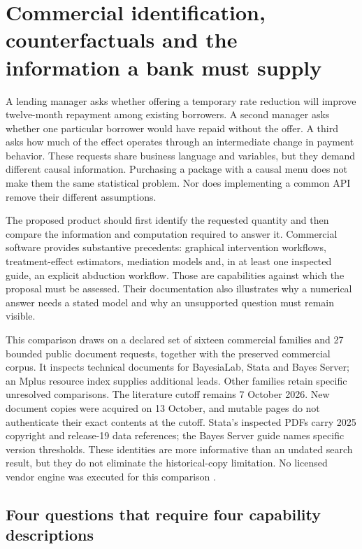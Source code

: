 \chapter{Commercial identification, counterfactuals and the information a bank must supply}
\label{exec13:commercial-identification}

A lending manager asks whether offering a temporary rate reduction will improve
twelve-month repayment among existing borrowers. A second manager asks whether
one particular borrower would have repaid without the offer. A third asks how
much of the effect operates through an intermediate change in payment behavior.
These requests share business language and variables, but they demand different
causal information. Purchasing a package with a causal menu does not make them
the same statistical problem. Nor does implementing a common API remove their
different assumptions.

The proposed product should first identify the requested quantity and then
compare the information and computation required to answer it. Commercial
software provides substantive precedents: graphical intervention workflows,
treatment-effect estimators, mediation models and, in at least one inspected
guide, an explicit abduction workflow. Those are capabilities against which the
proposal must be assessed. Their documentation also illustrates why a numerical
answer needs a stated model and why an unsupported question must remain visible.

This comparison draws on a declared set of sixteen commercial families and
27 bounded public document requests, together with the preserved commercial
corpus. It inspects technical documents for BayesiaLab, Stata and Bayes Server;
an Mplus resource index supplies additional leads. Other families retain
specific unresolved comparisons. The literature cutoff remains 7 October 2026.
New document copies were acquired on 13 October, and mutable pages do not
authenticate their exact contents at the cutoff. Stata's inspected PDFs carry
2025 copyright and release-19 data references; the Bayes Server guide names
specific version thresholds. These identities are more informative than an
undated search result, but they do not eliminate the historical-copy limitation.
No licensed vendor engine was executed for this comparison
\citep{exec13_ci_scope}.

\section{Four questions that require four capability descriptions}

